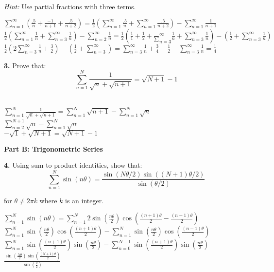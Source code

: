 \documentclass[12pt]{article}
\begin{document}
\textit{Hint:} Use partial fractions with three terms.
\\[8pt]
\begin{minipage}[t][4cm][t]{\linewidth}
    $\displaystyle \sum_{n=1}^{\infty} (\frac{.5}{n}+\frac{-1}{n+1}+\frac{.5}{n+2}) = \frac{1}{2} (\sum_{n=1}^{\infty} \frac{.5}{n} + \sum_{n=1}^{\infty} \frac{.5}{n+2}) - \sum_{n=1}^{\infty} \frac{1}{n+1}$
    \\[8pt] $\frac{1}{2} (\sum_{n=1}^{\infty} \frac{1}{n} + \sum_{n=3}^{\infty} \frac{1}{n}) - \sum_{n=2}^{\infty} \frac{1}{n} = \frac{1}{2} (\frac{1}{1} + \frac{1}{2} + \frac{}\sum_{n=3}^{\infty} \frac{1}{n} + \sum_{n=3}^{\infty} \frac{1}{n}) - (\frac{1}{2} + \sum_{n=3}^{\infty} \frac{1}{n})$
    \\[8pt] $\frac{1}{2} (2 \sum_{n=3}^{\infty} \frac{1}{n} + \frac{3}{2}) - (\frac{1}{2} + \sum_{n=3}^{\infty}) = \sum_{n=3}^{\infty} \frac{1}{n} + \frac{3}{4} - \frac{1}{2} - \sum_{n=3}^{\infty} \frac{1}{n} = \frac{1}{4}$
\end{minipage}

\textbf{3.} Prove that:
$$\sum_{n=1}^{N} \frac{1}{\sqrt{n} + \sqrt{n+1}} = \sqrt{N+1} - 1$$
\\[8pt]
\begin{minipage}[t][4cm][t]{\linewidth}
    $\displaystyle \sum_{n=1}^{N} \frac{1}{\sqrt{n} + \sqrt{n+1}} = \sum_{n=1}^{N} \sqrt{n+1} - \sum_{n=1}^{N} \sqrt{n}$
    \\[8pt] $\sum_{n=2}^{N+1} \sqrt{n} - \sum_{n=1}^{N} \sqrt{n}$
    \\[8pt] $-\sqrt{1} + \sqrt{N+1} = \sqrt{N+1} - 1$
\end{minipage}

\textbf{Part B: Trigonometric Series}

\textbf{4.} Using sum-to-product identities, show that:
$$\sum_{n=1}^{N} \sin(n\theta) = \frac{\sin(N\theta/2)\sin((N+1)\theta/2)}{\sin(\theta/2)}$$

for $\theta \neq 2\pi k$ where $k$ is an integer.
\\[8pt]
\begin{minipage}[t][5cm][t]{\linewidth}
    $\displaystyle \sum_{n=1}^{N} \sin(n\theta) = \sum_{n=1}^{N} 2\sin(\frac{n\theta}{2})\cos(\frac{(n+1)\theta}{2} - \frac{(n-1)\theta}{2})$
    \\[8pt] $\sum_{n=1}^{N} \sin(\frac{n\theta}{2})\cos(\frac{(n+1)\theta}{2}) - \sum_{n=1}^{N} \sin(\frac{n\theta}{2})\cos(\frac{(n-1)\theta}{2})$
    \\[8pt] $\sum_{n=1}^{N} \sin(\frac{(n+1)\theta}{2})\sin(\frac{n\theta}{2}) - \sum_{n=0}^{N-1} \sin(\frac{(n+1)\theta}{2})\sin(\frac{n\theta}{2})$
    \\[8pt] $\frac{\sin(\frac{N\theta}{2})\sin(\frac{(N+1)\theta}{2})}{\sin(\frac{\theta}{2})}$
\end{minipage}
\end{document}

